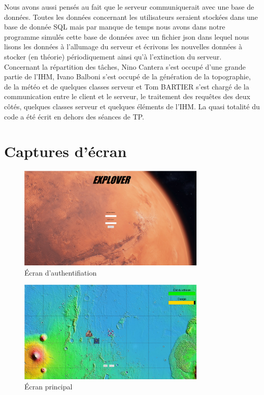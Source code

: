\documentclass[12pt,a4paper]{scrartcl}
\begin{document}
Nous avons aussi pensés au fait que le serveur communiquerait avec une base de données. Toutes les données concernant les utilisateurs seraient stockées dans une base de donnée SQL
mais par manque de temps nous avons dans notre programme simulés cette base de données avec un fichier json dans lequel nous lisons les données à l'allumage du serveur et écrivons les nouvelles
données à stocker (en théorie) périodiquement ainsi qu'à l'extinction du serveur.\\
Concernant la répartition des tâches, Nino Cantera s'est occupé d'une grande partie de l'IHM, Ivano Balboni s'est occupé de la génération de la topographie, de la météo et de quelques
classes serveur et Tom BARTIER s'est chargé de la communication entre le client et le serveur, le traitement des requêtes des deux côtés, quelques classes serveur et quelques éléments de l'IHM.
La quasi totalité du code a été écrit en dehors des séances de TP.

\section{Captures d'écran}
\begin{figure}[h]
    \centering
    \includegraphics[width=0.8\textwidth]{auth.png}
    \caption{Écran d'authentifiation }\label{auth}
\end{figure}

\begin{figure}[h]
    \centering
    \includegraphics[width=0.8\textwidth]{main.png}
    \caption{Écran principal}\label{auth}
\end{figure}
\end{document}
